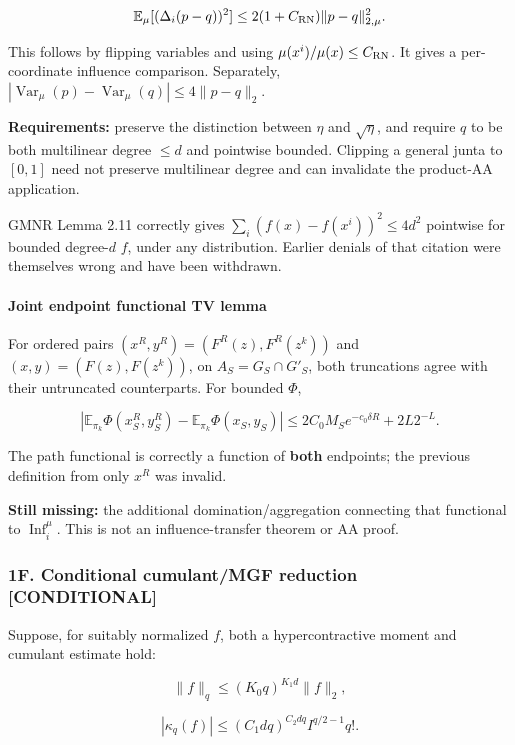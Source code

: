 \[\mathbb E_\mu[(\Delta_i(p-q))^2]
\le2(1+C_{\rm RN})\|p-q\|_{2,\mu}^2.\]

This follows by flipping variables and using \(\mu(x^i)/\mu(x)\le C_{\rm RN}\). It gives a per-coordinate influence comparison. Separately, \(|\operatorname{Var}_\mu(p)-\operatorname{Var}_\mu(q)|\le4\|p-q\|_2\).

\textbf{Requirements:} preserve the distinction between \(\eta\) and \(\sqrt\eta\), and require \(q\) to be both multilinear degree \(\le d\) and pointwise bounded. Clipping a general junta to \([0,1]\) need not preserve multilinear degree and can invalidate the product-AA application.

GMNR Lemma 2.11 correctly gives \(\sum_i(f(x)-f(x^i))^2\le4d^2\) pointwise for bounded degree-\(d\) \(f\), under any distribution. Earlier denials of that citation were themselves wrong and have been withdrawn.

\paragraph{Joint endpoint functional TV lemma}\label{joint-endpoint-functional-tv-lemma}

For ordered pairs \((x^R,y^R)=(F^R(z),F^R(z^k))\) and \((x,y)=(F(z),F(z^k))\), on \(A_S=G_S\cap G'_S\), both truncations agree with their untruncated counterparts. For bounded \(\Phi\),

\[\left|\mathbb E_{\pi_k}\Phi(x_S^R,y_S^R)-\mathbb E_{\pi_k}\Phi(x_S,y_S)\right|
\le 2C_0M_Se^{-c_0\delta R}+2L2^{-L}.\]

The path functional is correctly a function of \textbf{both} endpoints; the previous definition from only \(x^R\) was invalid.

\textbf{Still missing:} the additional domination/aggregation connecting that functional to \(\operatorname{Inf}_i^\mu\). This is not an influence-transfer theorem or AA proof.

\subsubsection{1F. Conditional cumulant/MGF reduction {[}CONDITIONAL{]}}\label{f.-conditional-cumulantmgf-reduction-conditional}

Suppose, for suitably normalized \(f\), both a hypercontractive moment and cumulant estimate hold:

\[\|f\|_q\le(K_0q)^{K_1d}\|f\|_2, \tag{HC}\]

\[|\kappa_q(f)|\le(C_1dq)^{C_2dq}I^{q/2-1}q!. \tag{CU}\]

